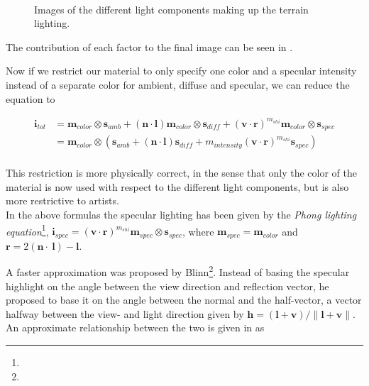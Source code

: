 \begin{figure}
  \centering
  \\
  \caption{Images of the different light components making up the
    terrain lighting.}
  \label{fig:lightComponents}
\end{figure}


The contribution of each factor to the final image can be seen in
.

Now if we restrict our material to only specify one color and a
specular intensity instead of a separate color for ambient, diffuse and
specular, we can reduce the equation to

\begin{displaymath}
  \begin{array}{rl}
    \mathbf{i}_{tot} &= \mathbf{m}_{color} \otimes \mathbf{s}_{amb} + (\mathbf{n} \cdot
    \mathbf{l}) \mathbf{m}_{color} \otimes \mathbf{s}_{diff} +
    (\mathbf{v} \cdot \mathbf{r})^{m_{shi}} \mathbf{m}_{color} \otimes
    \mathbf{s}_{spec} \\
    &= \mathbf{m}_{color} \otimes (\mathbf{s}_{amb} + (\mathbf{n} \cdot
    \mathbf{l}) \mathbf{s}_{diff} + m_{intensity} (\mathbf{v} \cdot
    \mathbf{r})^{m_{shi}} \mathbf{s}_{spec}) \\
  \end{array}
\end{displaymath}

This restriction is more physically correct, in the sense that only
the color of the material is now used with respect to the different
light components, but is also more restrictive to artists.\\

In the above formulas the specular lighting has been given by the
\emph{Phong lighting equation}\footnote{},
$\mathbf{i}_{spec} = (\mathbf{v} \cdot \mathbf{r})^{m_{shi}}
\mathbf{m}_{spec} \otimes \mathbf{s}_{spec}$, where $\mathbf{m}_{spec}
= \mathbf{m}_{color}$ and $\mathbf{r} = 2 (\mathbf{n} \cdot
\ \mathbf{l}) - \mathbf{l}$.

\pagebreak

A faster approximation was proposed by
Blinn\footnote{}. Instead of basing the
specular highlight on the angle between the view direction and
reflection vector, he proposed to base it on the angle between the
normal and the half-vector, a vector halfway between the view- and
light direction given by $\mathbf{h} = (\mathbf{l} + \mathbf{v}) /
\|\mathbf{l} + \mathbf{v}\|$. An approximate relationship between the
two is given in  as

